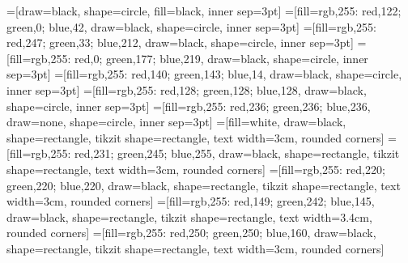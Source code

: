 
=[draw=black, shape=circle, fill=black, inner sep=3pt]
=[fill={rgb,255: red,122; green,0; blue,42}, draw=black, shape=circle, inner sep=3pt]
=[fill={rgb,255: red,247; green,33; blue,212}, draw=black, shape=circle, inner sep=3pt]
=[fill={rgb,255: red,0; green,177; blue,219}, draw=black, shape=circle, inner sep=3pt]
=[fill={rgb,255: red,140; green,143; blue,14}, draw=black, shape=circle, inner sep=3pt]
=[fill={rgb,255: red,128; green,128; blue,128}, draw=black, shape=circle, inner sep=3pt]
=[fill={rgb,255: red,236; green,236; blue,236}, draw=none, shape=circle, inner sep=3pt]
=[fill=white, draw=black, shape=rectangle, tikzit shape=rectangle, text width=3cm, rounded corners]
=[fill={rgb,255: red,231; green,245; blue,255}, draw=black, shape=rectangle, tikzit shape=rectangle, text width=3cm, rounded corners]
=[fill={rgb,255: red,220; green,220; blue,220}, draw=black, shape=rectangle, tikzit shape=rectangle, text width=3cm, rounded corners]
=[fill={rgb,255: red,149; green,242; blue,145}, draw=black, shape=rectangle, tikzit shape=rectangle, text width=3.4cm, rounded corners]
=[fill={rgb,255: red,250; green,250; blue,160}, draw=black, shape=rectangle, tikzit shape=rectangle, text width=3cm, rounded corners]

